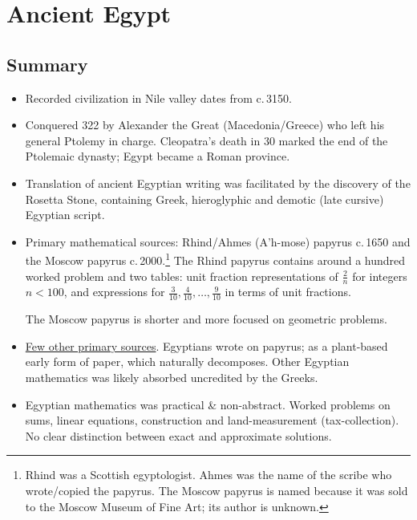 
\graphicspath{{1egypt/pics/}}

\section{Ancient Egypt}

\subsection*{Summary}

\begin{itemize}\itemsep0pt
  \item Recorded civilization in Nile valley dates from c.\,3150\BC.
  
  \item Conquered 322\BC{} by Alexander the Great (Macedonia/Greece) who left his general Ptolemy in charge. Cleopatra's death in 30\BC{} marked the end of the Ptolemaic dynasty; Egypt became a Roman province. 
  
  \item Translation of ancient Egyptian writing was facilitated by the  discovery of the Rosetta Stone, containing Greek, hieroglyphic and demotic (late cursive) Egyptian script. 
  
  \item Primary mathematical sources: Rhind/Ahmes (A'h-mose) papyrus c.\,1650\BC{} and the Moscow papyrus c.\,2000\BC.\footnote{%
  	Rhind was a Scottish egyptologist. Ahmes was the name of the scribe who wrote/copied the papyrus. The Moscow papyrus is named because it was sold to the Moscow Museum of Fine Art; its author is unknown.%
  } The Rhind papyrus contains around a hundred worked problem and two tables: unit fraction representations of $\frac 2n$ for integers $n<100$, and expressions for $\frac 3{10},\frac 4{10},\ldots,\frac 9{10}$ in terms of unit fractions.\par
  The Moscow papyrus is shorter and more focused on geometric problems.  
  \item \href{https://en.wikipedia.org/wiki/List_of_papyri_from_ancient_Egypt}{Few other primary sources}. Egyptians wrote on papyrus; as a plant-based early form of paper, which naturally decomposes. Other Egyptian mathematics was likely absorbed uncredited by the Greeks.
  \item Egyptian mathematics was practical \& non-abstract. Worked problems on sums, linear equations, construction and land-measurement (tax-collection). No clear distinction between exact and approximate solutions.
\end{itemize}

